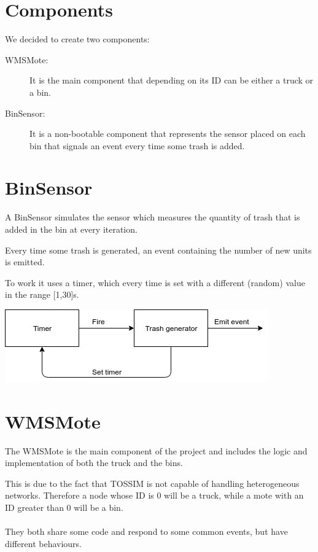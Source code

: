 \documentclass[a4paper,12pt,notitlepage]{report}
\begin{document}
\section*{Components}
We decided to create two components:
\begin{description}
    \item[WMSMote:] It is the main component that depending on its ID can be either a truck or a bin.
    \item[BinSensor:] It is a non-bootable component that represents the sensor placed on each bin that signals an event every time some trash is added. 
\end{description}

\section*{BinSensor}
A BinSensor simulates the sensor which measures the quantity of trash that is added in the bin at every iteration.

Every time some trash is generated, an event containing the number of new units is emitted.

To work it uses a timer, which every time is set with a different (random) value in the range [1,30]s.\\[1em]
\begin{center}
    \includegraphics[scale=0.7]{sensor.png}
\end{center}

\section*{WMSMote}
The WMSMote is the main component of the project and includes the logic and implementation of both the truck and the bins.

This is due to the fact that TOSSIM is not capable of handling heterogeneous networks. Therefore a node whose ID is 0 will be a truck,
while a mote with an ID greater than 0 will be a bin.
\\\\
They both share some code and respond to some common events, but have different behaviours.
\end{document}
